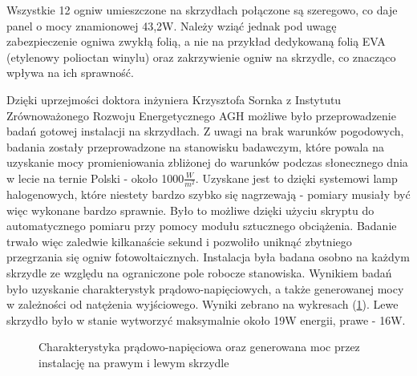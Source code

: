 \documentclass[12pt, a4paper]{article}
\let\oldref\ref
\renewcommand{\ref}[1]{(\oldref{#1})}
\begin{document}
Wszystkie 12 ogniw umieszczone na skrzydłach połączone są szeregowo, co daje panel o mocy znamionowej 43,2W. Należy wziąć jednak pod uwagę zabezpieczenie ogniwa zwykłą folią, a nie na przykład dedykowaną folią EVA (etylenowy polioctan winylu) oraz zakrzywienie ogniw na skrzydle, co znacząco wpływa na ich sprawność.

Dzięki uprzejmości doktora inżyniera Krzysztofa Sornka z Instytutu Zrównoważonego Rozwoju Energetycznego AGH możliwe było przeprowadzenie badań gotowej instalacji na skrzydłach. Z uwagi na brak warunków pogodowych, badania zostały przeprowadzone na stanowisku badawczym, które powala na uzyskanie mocy promieniowania zbliżonej do warunków podczas słonecznego dnia w lecie na ternie Polski - około 1000$\frac{W}{m^2}$. Uzyskane jest to dzięki systemowi lamp halogenowych, które niestety bardzo szybko się nagrzewają - pomiary musiały być więc wykonane bardzo sprawnie. Było to możliwe dzięki użyciu skryptu do automatycznego pomiaru przy pomocy modułu sztucznego obciążenia. Badanie trwało więc zaledwie kilkanaście sekund i pozwoliło uniknąć zbytniego przegrzania się ogniw fotowoltaicznych. Instalacja była badana osobno na każdym skrzydle ze względu na ograniczone pole robocze stanowiska. Wynikiem badań było uzyskanie charakterystyk prądowo-napięciowych, a także generowanej mocy w zależności od natężenia wyjściowego. Wyniki zebrano na wykresach \ref{fig:charakterystyki}. Lewe skrzydło było w stanie wytworzyć maksymalnie około 19W energii, prawe - 16W.

\begin{figure}[ht]
    \centering
    \qquad
    \caption{Charakterystyka prądowo-napięciowa oraz generowana moc przez instalację na prawym i lewym skrzydle}
    \label{fig:charakterystyki}
\end{figure}
\end{document}
